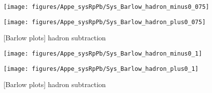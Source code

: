 \begin{itemize}
     \begin{figure}[H]
     \begin{minipage}{0.5\hsize} 
     \begin{center}
     \texttt{[image: figures/Appe\_sysRpPb/Sys\_Barlow\_hadron\_minus0\_075]}
     \end{center}
     \end{minipage}
     \begin{minipage}{0.5\hsize} 
     \begin{center}
     \texttt{[image: figures/Appe\_sysRpPb/Sys\_Barlow\_hadron\_plus0\_075]}
     \end{center}
     \end{minipage}
     \caption{[Barlow plots] hadron subtraction}
     \label{fig:Sys_hadron}
     \end{figure}
     
     \begin{figure}[H]
     \begin{minipage}{0.5\hsize} 
     \begin{center}
     \texttt{[image: figures/Appe\_sysRpPb/Sys\_Barlow\_hadron\_minus0\_1]}
     \end{center}
     \end{minipage}
     \begin{minipage}{0.5\hsize} 
     \begin{center}
     \texttt{[image: figures/Appe\_sysRpPb/Sys\_Barlow\_hadron\_plus0\_1]}
     \end{center}
     \end{minipage}
     \caption{[Barlow plots] hadron subtraction}
     \label{fig:Sys_hadron}
     \end{figure}
      
      
  \end{itemize}